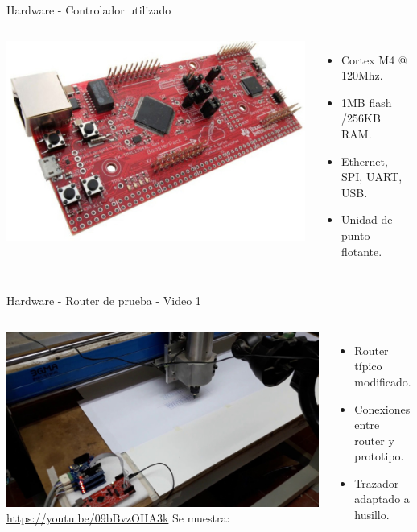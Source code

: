 \documentclass[aspectratio= 43]{beamer}
\begin{document}
\begin{frame}{Hardware - Controlador utilizado}
   \begin{columns}
      \includegraphics[width=\textwidth, right]{./Figures/tivac.jpg}
      \begin{itemize}
         \item{Cortex M4 @ 120Mhz.}
         \item{1MB flash /256KB RAM.}
         \item{Ethernet, SPI, UART, USB.}
         \item{Unidad de punto flotante.}
      \end{itemize}
   \end{columns}
\end{frame}

\begin{frame}{Hardware - Router de prueba - Video 1}
   \begin{columns}
   \href{run:./videos/video1.mp4}{
      \includegraphics[width=\textwidth, left]{./videos/shot0001.jpg}
   }
   \href{https://youtu.be/09bBvzOHA3k}{https://youtu.be/09bBvzOHA3k}
      Se muestra:
      \begin{itemize}
         \item{Router típico modificado.}
         \item{Conexiones entre router y prototipo.}
         \item{Trazador adaptado a husillo.}
      \end{itemize}
   \end{columns}
\end{frame}
\end{document}
